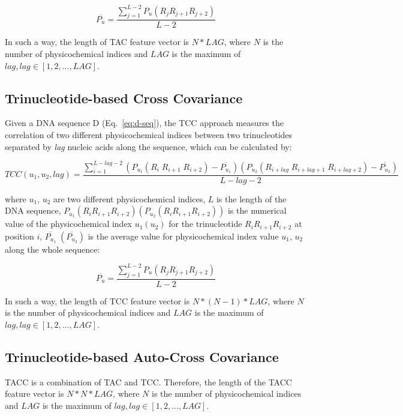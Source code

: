 \begin{equation}\label{eq:tac-2}
    \overline{P_{u}} = \frac{\sum_{j=1}^{L-2}P_{u}(R_{j}R_{j+1}R_{j+2})}{L-2}
\end{equation}

In such a way, the length of \gls{TAC} feature vector is $N*LAG$, where $N$ is the number of physicochemical indices and $LAG$ is the maximum of $lag, lag \in [1,2,...,LAG]$.

\subsection{Trinucleotide-based Cross Covariance}

Given a DNA sequence D (Eq.~\ref{eq:d-seq}), the \gls{TCC} approach measures the correlation of two different physicochemical indices between two trinucleotides separated by \textit{lag} nucleic acids along the sequence, which can be calculated by:

\begin{equation}\label{eq:DCC}
    TCC(u_{1},u_{2},lag) = \frac{\sum_{i=1}^{L-lag-2}(P_{u_{1}}(R_{i}\;R_{i+1}\;R_{i+2}) - \overline{P_{u_{1}}})(P_{u_{2}}(R_{i+lag}\;R_{i+lag+1}\;R_{i+lag+2}) - \overline{P_{u_{2}}})}{L-lag-2}
\end{equation}

where $u_{1}$, $u_{2}$ are two different physicochemical indices, $L$ is the length of the DNA sequence, $P_{u_{1}}(R_{i}R_{i+1}R_{i+2}) (P_{u_{2}}(R_{i}R_{i+1}R_{i+2}))$ is the numerical value of the physicochemical index $u_{1}(u_{2})$ for the trinucleotide $R_{i}R_{i+1}R_{i+2}$ at position $i$, $\overline{P_{u_{1}}}\;(\overline{P_{u_{2}}})$ is the average value for physicochemical index value $u_{1}$, $u_{2}$ along the whole sequence:

\begin{equation}\label{eq:DAC-PU2}
    \overline{P_{u}} = \frac{\sum_{j=1}^{L-2}P_{u}(R_{j}R_{j+1}R_{j+2})}{L-2}
\end{equation}

In such a way, the length of \gls{TCC} feature vector is $N*(N-1)*LAG$, where $N$ is the number of physicochemical indices and $LAG$ is the maximum of $lag, lag \in [1,2,...,LAG]$.


\subsection{Trinucleotide-based Auto-Cross Covariance}
\gls{TACC} is a combination of \gls{TAC} and \gls{TCC}. Therefore, the length of the \gls{TACC} feature vector is $N*N*LAG$, where $N$ is the number of physicochemical indices and $LAG$ is the maximum of $lag, lag \in [1,2,...,LAG]$.

